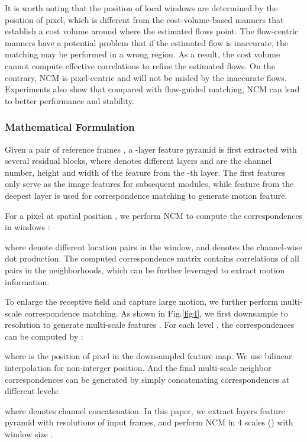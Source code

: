 \documentclass[sigconf]{acmart}
\begin{document}
It is worth noting that the position of local windows are determined by the position of pixel, which is different from the cost-volume-based manners \cite{huang2020rife, park2020bmbc} that establish a cost volume around where the estimated flows point. The flow-centric manners have a potential problem that if the estimated flow is inaccurate, the matching may be performed in a wrong region. As a result, the cost volume cannot compute effective correlations to refine the estimated flows. On the contrary, NCM is pixel-centric and will not be misled by the inaccurate flows. Experiments also show that compared with flow-guided matching, NCM can lead to better performance and stability.  


\subsubsection{Mathematical Formulation}
Given a pair of reference frames , a -layer feature pyramid  is first extracted with several residual blocks\cite{he2016deep}, where  denotes different layers and  are the channel number, height and width of the feature from the -th layer. The first  features only serve as the image features for subsequent modules, while feature from the deepest layer  is used for correspondence matching to generate motion feature.

For a pixel at spatial position , we perform NCM to compute the correspondences in  windows : 

where  denote different location pairs in the window, and  denotes the channel-wise dot production. The computed correspondence matrix  contains correlations of all pairs in the neighborhoods, which can be further leveraged to extract motion information.

To enlarge the receptive field and capture large motion, we further perform multi-scale correspondence matching. As shown in Fig.\ref{fig4}, we first downsample  to  resolution to generate multi-scale features . For each level , the correspondences can be computed by :

where  is the position of pixel in the downsampled feature map. We use bilinear interpolation for non-interger position. And the final multi-scale neighbor correspondences can be generated by simply concatenating correspondences at different levels:

where  denotes channel concatenation. In this paper, we extract  layers feature pyramid with  resolutions of input frames, and perform NCM in 4 scales () with window size .
\end{document}
